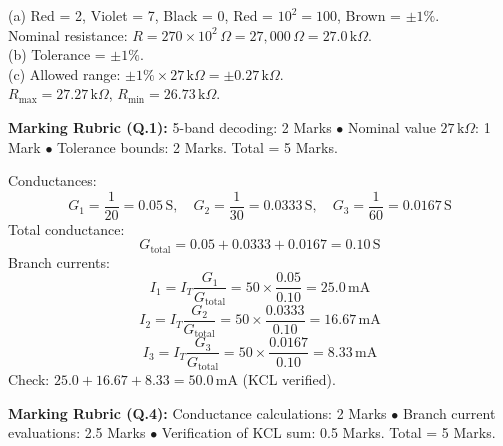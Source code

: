 \begin{solutionbox}[Solution to Q.1]
(a) Red = 2, Violet = 7, Black = 0, Red = $10^2 = 100$, Brown = $\pm 1\%$.\\
Nominal resistance: $R = 270 \times 10^2\,\Omega = 27{,}000\,\Omega = 27.0\,\mathrm{k}\Omega$.\\
(b) Tolerance = $\pm 1\%$.\\
(c) Allowed range: $\pm 1\% \times 27\,\mathrm{k}\Omega = \pm 0.27\,\mathrm{k}\Omega$.\\
$R_{\max} = 27.27\,\mathrm{k}\Omega$, $R_{\min} = 26.73\,\mathrm{k}\Omega$.
\end{solutionbox}
\begin{markingrubric}
\textbf{Marking Rubric (Q.1):} 5-band decoding: 2 Marks $\bullet$ Nominal value $27\,\mathrm{k}\Omega$: 1 Mark $\bullet$ Tolerance bounds: 2 Marks. Total = 5 Marks.
\end{markingrubric}

\begin{solutionbox}[Solution to Q.4]
Conductances:
\[ G_1 = \frac{1}{20} = 0.05\,\mathrm{S}, \quad G_2 = \frac{1}{30} = 0.0333\,\mathrm{S}, \quad G_3 = \frac{1}{60} = 0.0167\,\mathrm{S} \]
Total conductance:
\[ G_{\mathrm{total}} = 0.05 + 0.0333 + 0.0167 = 0.10\,\mathrm{S} \]
Branch currents:
\[ I_1 = I_T \frac{G_1}{G_{\mathrm{total}}} = 50 \times \frac{0.05}{0.10} = 25.0\,\mathrm{mA} \]
\[ I_2 = I_T \frac{G_2}{G_{\mathrm{total}}} = 50 \times \frac{0.0333}{0.10} = 16.67\,\mathrm{mA} \]
\[ I_3 = I_T \frac{G_3}{G_{\mathrm{total}}} = 50 \times \frac{0.0167}{0.10} = 8.33\,\mathrm{mA} \]
Check: $25.0 + 16.67 + 8.33 = 50.0\,\mathrm{mA}$ (KCL verified).
\end{solutionbox}
\begin{markingrubric}
\textbf{Marking Rubric (Q.4):} Conductance calculations: 2 Marks $\bullet$ Branch current evaluations: 2.5 Marks $\bullet$ Verification of KCL sum: 0.5 Marks. Total = 5 Marks.
\end{markingrubric}
\newpage
